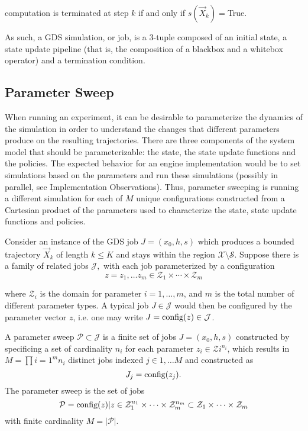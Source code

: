 \documentclass[]{article}
\begin{document}
computation is terminated at step $k$ if and only if $s(\vec X_k)=$True.

As such, a GDS simulation, or job, is a 3-tuple composed of an initial state, a state update pipeline (that is, the composition of a blackbox and a whitebox operator) and a termination condition.

\hypertarget{sweep}{%
\subsection{Parameter Sweep}\label{sweep}}

When running an experiment, it can be desirable to parameterize the dynamics of the simulation in order to understand the changes that different parameters produce on the resulting trajectories. There are three components of the system model that should be parameterizable: the state, the state update functions and the policies. The expected behavior for an engine implementation would be to set simulations based on the parameters and run these simulations (possibly in parallel, see Implementation Observations). Thus, parameter sweeping is running a different simulation for each of $M$ unique configurations constructed from a Cartesian product of the parameters used to characterize the state, state update functions and policies.

Consider an instance of the GDS job $J=(x_0,h,s)$ which produces a bounded trajectory $\vec X_k$ of length $k\le K$ and stays within the region $\mathcal{X} \setminus \mathcal{S}$. Suppose there is a family of related jobs $\mathcal{J},$ with each job parameterized by a configuration $$ z = {z_1, \ldots z_m } \in \mathcal{Z}_1 \times \cdots \times \mathcal{Z}_m $$

where $\mathcal{Z}_i$ is the domain for parameter $i = 1, \ldots, m$, and $m$ is the total number of different parameter types. A typical job $J \in \mathcal{J}$ would then be configured by the parameter vector $z$, i.e. one may write $J=\hbox{config}(z) \in \mathcal{J}$.

A parameter sweep $\mathcal{P}\subset \mathcal{J}$ is a finite set of jobs $J=(x_0,h,s)$ constructed by specificing a set of cardinality $n_i$ for each parameter $z_i \in \mathcal{Z}i^{n_i}$, which results in $M=\prod{i=1}^m n_i$ distinct jobs indexed $j\in{1,\ldots M}$ and constructed as $$ J_j = \hbox{config}(z_j). $$ The parameter sweep is the set of jobs $$ \mathcal{P} = {\hbox{config}(z) | z \in \mathcal{Z}^{n_1}_1 \times \cdots \times \mathcal{Z}^{n_m}_m \subset \mathcal{Z}_1 \times \cdots \times \mathcal{Z}_m } $$ with finite cardinality $M = |\mathcal{P}|$.
\end{document}

